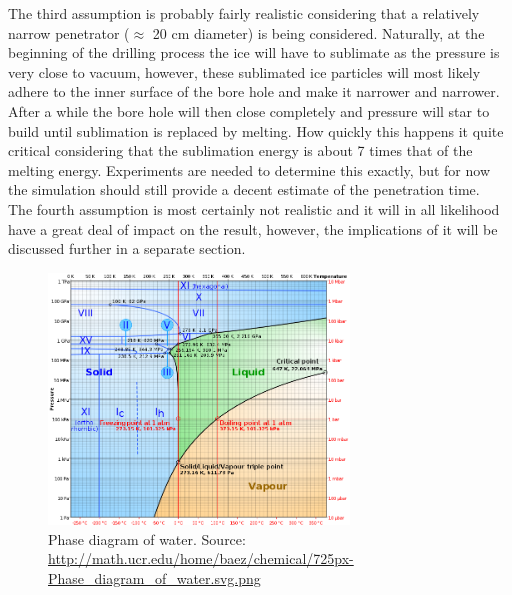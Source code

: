 \noindent
The third assumption is probably fairly realistic considering that a relatively narrow penetrator ($\approx$ 20 cm diameter) is being considered. Naturally, at the beginning of the drilling process the ice will have to sublimate as the pressure is very close to vacuum, however, these sublimated ice particles will most likely adhere to the inner surface of the bore hole and make it narrower and narrower. After a while the bore hole will then close completely and pressure will star to build until sublimation is replaced by melting. How quickly this happens it quite critical considering that the sublimation energy is about 7 times\cite{website:engineeringToolbox} that of the melting energy. Experiments are needed to determine this exactly, but for now the simulation should still provide a decent estimate of the penetration time.\\

\noindent
The fourth assumption is most certainly not realistic and it will in all likelihood have a great deal of impact on the result, however, the implications of it will be discussed further in a separate section.

\begin{figure}[ht]
	\centering
	\includegraphics[width=8cm]{figures/LAMC/waterPhase}
	\caption{Phase diagram of water. Source: \url{http://math.ucr.edu/home/baez/chemical/725px-Phase_diagram_of_water.svg.png}}
	\label{fig:waterPhase}
\end{figure}

